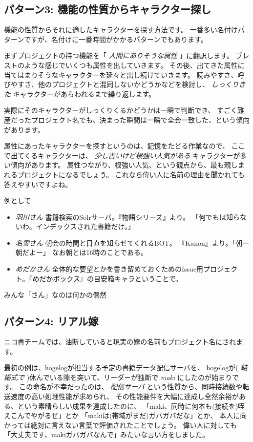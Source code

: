 \subsection{パターン3: 機能の性質からキャラクター探し}

機能の性質からそれに適したキャラクターを探す方法です。
一番多い名付けパターンですが、名付けに一番時間がかかるパターンでもあります。

まずプロジェクトの持つ機能を「 \emph{人間にありそうな属性}
」に翻訳します。 ブレストのような感じでいくつも属性を出していきます。
その後、出てきた属性に当てはまりそうなキャラクターを延々と出し続けていきます。
読みやすさ、呼びやすさ、他のプロジェクトと混同しないかどうかなどを検討し、
\emph{しっくりきた} キャラクターがあらわれるまで繰り返します。

実際にそのキャラクターがしっくりくるかどうかは一瞬で判断でき、
すごく難産だったプロジェクト名でも、決まった瞬間は一瞬で全会一致した、という傾向があります。

属性にあったキャラクターを探すというのは、記憶をたどる作業なので、
ここで出てくるキャラクターは、 \emph{少し古いけど根強い人気がある}
キャラクターが多い傾向があります。
属性つながり、根強い人気、という観点から、最も親しまれるプロジェクトになるでしょう。
これなら偉い人に名前の理由を聞かれても答えやすいですよね。

例として

\begin{itemize}
\itemsep1pt\parskip0pt
\item
  \emph{羽川さん} 書籍検索のSolrサーバ。『物語シリーズ』より。
  「何でもは知らないわ。インデックスされた書籍だけ。」
\item
  \emph{名雪さん} 朝会の時間と日直を知らせてくれるBOT。
  『Kanon』より。「朝ー朝だよー」 なお朝とは16時のことである。
\item
  \emph{めだかさん}
  全体的な要望とかを書き留めておくためのIssue用プロジェクト。『めだかボックス』の目安箱キャラということで。
\end{itemize}

みんな「さん」なのは何かの偶然

\subsection{パターン4: リアル嫁}

ニコ書チームでは、油断していると現実の嫁の名前もプロジェクト名にされます。

最初の例は、hogelogが担当する予定の書籍データ配信サーバを、 hogelogが(
\emph{結婚式で} )休んでいる隙を突いて、リーダーが独断で \emph{maki}
にしたのが始まりです。 この命名が不幸だったのは、 \emph{配信サーバ}
という性質から、同時接続数や転送速度の高い処理性能が求められ、
その性能要件を大幅に達成し全然余裕がある、という素晴らしい成果を達成したのに、
「maki、同時に何本も(接続を)咥えこんでやがるぜ」とか
「makiは(帯域がまだ)ガバガバだな」とか、
本人に向かっては絶対に言えない言葉で評価されたことでしょう。
偉い人に対しても「大丈夫です、makiガバガバなんで」みたいな言い方をしました。

